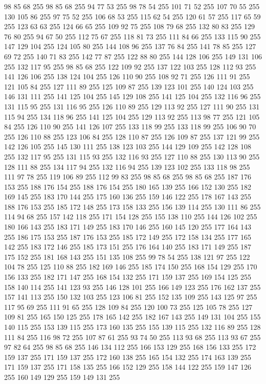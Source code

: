 98 85 68 255 98 85 68 255 94 77 53 255 98 78 54 255 101 71 52 255 107 70 55 255 130 105 86 255 97 75 52 255 106 68 53 255 115 62 54 255 120 61 57 255 117 65 59 255 123 63 63 255 124 66 65 255 109 92 75 255 108 79 68 255 132 80 83 255 129 76 80 255 94 67 50 255 112 75 67 255 118 81 73 255 111 84 66 255 133 115 90 255 147 129 104 255 124 105 80 255 144 108 96 255 137 76 84 255 141 78 85 255 127 69 72 255 140 71 83 255 142 77 87 255 122 88 80 255 144 128 106 255 149 131 106 255 132 117 95 255 98 85 68 255 122 109 92 255 137 122 103 255 128 112 93 255 141 126 106 255 138 124 104 255 126 110 90 255 108 92 71 255 126 111 91 255 121 105 84 255 127 111 89 255 125 109 87 255 139 123 101 255 140 124 103 255 146 131 111 255 141 125 104 255 145 129 108 255 141 125 104 255 132 116 96 255 131 115 95 255 131 116 95 255 126 110 89 255 129 113 92 255 127 111 90 255 131 115 94 255 134 118 96 255 141 125 104 255 129 113 92 255 113 98 77 255
121 105 84 255 126 110 90 255 141 126 107 255 133 118 99 255 133 118 99 255 106 90 70 255 126 110 88 255 123 106 84 255 128 110 87 255 126 109 87 255 137 121 99 255 142 126 105 255 145 130 111 255 138 123 103 255 144 129 109 255 142 128 108 255 132 117 95 255 131 115 93 255 132 116 93 255 127 110 88 255 130 113 90 255 128 111 88 255 134 117 94 255 132 116 94 255 139 123 102 255 133 118 98 255 111 97 78 255 119 106 89 255 112 99 83 255 98 85 68 255 98 85 68 255 187 176 153 255 188 176 154 255 188 176 154 255 180 165 139 255 166 152 130 255 182 169 145 255 183 170 144 255 175 160 136 255 159 146 122 255 178 167 143 255 188 176 153 255 185 172 148 255 173 158 133 255 156 139 114 255 130 111 86 255 114 94 68 255 157 142 118 255 171 154 128 255 155 138 110 255 144 126 102 255 180 166 143 255 183 171 149 255 183 170 146 255 160 145 120 255 177 164 143 255 186 175 153 255 187 176 153 255 185 172 149 255 172 158 134 255 177 165 142 255 183 172 146 255 185 173 151 255 176 164 140 255
183 171 149 255 187 175 152 255 181 168 143 255 151 135 108 255 99 78 54 255 138 121 97 255 122 104 78 255 125 110 88 255 182 169 146 255 185 174 150 255 168 154 129 255 170 156 133 255 182 171 147 255 168 154 132 255 171 159 137 255 169 154 125 255 158 140 114 255 141 123 93 255 146 128 101 255 166 149 123 255 176 162 137 255 157 141 113 255 150 132 103 255 123 106 81 255 152 135 109 255 143 125 97 255 117 95 69 255 111 91 65 255 128 109 84 255 120 100 73 255 125 105 78 255 127 109 81 255 165 150 125 255 178 165 142 255 182 167 143 255 149 131 104 255 155 140 115 255 153 139 115 255 173 160 135 255 155 139 115 255 132 116 89 255 128 111 84 255 116 98 72 255 107 87 61 255 93 74 50 255 113 93 68 255 113 93 67 255 97 82 64 255 98 85 68 255 146 134 112 255 166 153 129 255 168 156 133 255 172 159 137 255 171 159 137 255 172 160 138 255 165 154 132 255 174 163 139 255 171 159 137 255 171 158 135 255 166 152 129 255 158 144 122 255 159 147 126 255 160 149 129 255 159 149 131 255
